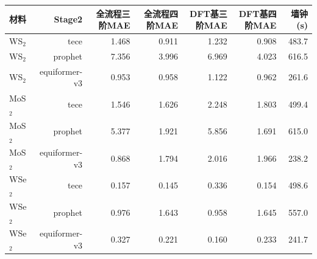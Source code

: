 \begin{tabular}{lrrrrrr}
\toprule
材料 & Stage2 & 全流程三阶MAE & 全流程四阶MAE & DFT基三阶MAE & DFT基四阶MAE & 墙钟(s) \\
\midrule
WS$_2$ & tece & 1.468 & 0.911 & 1.232 & 0.908 & 483.7 \\
WS$_2$ & prophet & 7.356 & 3.996 & 6.969 & 4.023 & 616.5 \\
WS$_2$ & equiformer-v3 & 0.953 & 0.958 & 1.122 & 0.962 & 261.6 \\
MoS$_2$ & tece & 1.546 & 1.626 & 2.248 & 1.803 & 499.4 \\
MoS$_2$ & prophet & 5.377 & 1.921 & 5.856 & 1.691 & 615.0 \\
MoS$_2$ & equiformer-v3 & 0.868 & 1.794 & 2.016 & 1.966 & 238.2 \\
WSe$_2$ & tece & 0.157 & 0.145 & 0.336 & 0.154 & 498.6 \\
WSe$_2$ & prophet & 0.976 & 1.643 & 0.958 & 1.645 & 557.0 \\
WSe$_2$ & equiformer-v3 & 0.327 & 0.221 & 0.160 & 0.233 & 241.7 \\
\bottomrule
\end{tabular}
